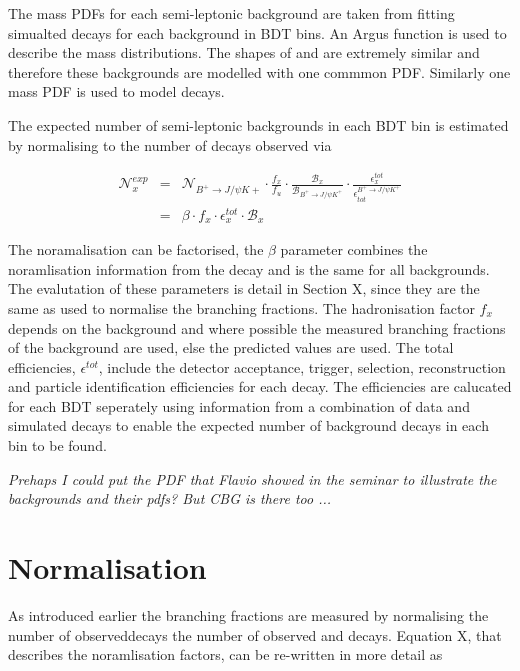 The mass PDFs for each semi-leptonic background are taken from fitting simualted decays for each background in BDT bins. An Argus function is used to describe the mass distributions. The shapes of \bdpimunu and \bsKmunu are extremely similar and therefore these backgrounds are modelled with one commmon PDF. Similarly one mass PDF is used to model \bpimumu decays.

The expected number of semi-leptonic backgrounds in each BDT bin is estimated by normalising to the number of \bujpsik decays observed via

\begin{eqnarray}
\mathcal{N}^{exp}_{x} &=& \mathcal{N}_{B^{+} \to J/\psi K{+}} \cdot \frac{f_{x}}{f_{u}} \cdot \frac{\mathcal{B}_{x}}{\mathcal{B}_{B^{+} \to J/\psi K^{+}}} \cdot \frac{\epsilon^{tot}_{x}}{\epsilon_{tot}^{B^{+} \to J/\psi K^{+}}} \\
&=& \beta \cdot f_{x} \cdot \epsilon^{tot}_{x} \cdot \mathcal{B}_{x}
\label{eq:BkgndPredict}
\end{eqnarray}

The noramalisation can be factorised, the $\beta$ parameter combines the noramlisation information from the \bujpsik decay and is the same for all backgrounds. The evalutation of these parameters is detail in Section X, since they are the same as used to normalise the \bmumu branching fractions. The hadronisation factor $f_{x}$ depends on the background and where possible the measured branching fractions of the background are used, else the predicted values are used. 
The total efficiencies, $\epsilon^{tot}$, include the detector acceptance, trigger, selection, reconstruction and particle identification efficiencies for each decay. The efficiencies are calucated for each BDT seperately using information from a combination of data and simulated decays to enable the expected number of background decays in each bin to be found.

{\it Prehaps I could put the PDF that Flavio showed in the seminar to illustrate the backgrounds and their pdfs? But CBG is there too ...}

\section{Normalisation}

As introduced earlier the \bmumu branching fractions are measured by normalising the number of observed\bmumu decays the number of observed \bujpsik and \bdkpi decays. Equation X, that describes the noramlisation factors, can be re-written in more detail as


